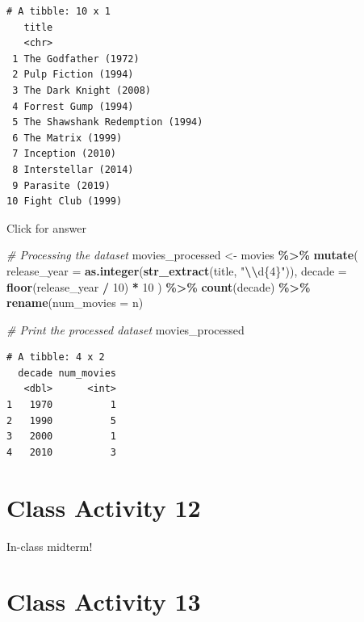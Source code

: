 \documentclass[
]{book}
\newenvironment{Shaded}{\begin{snugshade}}{\end{snugshade}}
\newcommand{\AttributeTok}[1]{\textcolor[rgb]{0.13,0.29,0.53}{#1}}
\newcommand{\CommentTok}[1]{\textcolor[rgb]{0.56,0.35,0.01}{\textit{#1}}}
\newcommand{\DecValTok}[1]{\textcolor[rgb]{0.00,0.00,0.81}{#1}}
\newcommand{\FunctionTok}[1]{\textcolor[rgb]{0.13,0.29,0.53}{\textbf{#1}}}
\newcommand{\NormalTok}[1]{#1}
\newcommand{\OtherTok}[1]{\textcolor[rgb]{0.56,0.35,0.01}{#1}}
\newcommand{\SpecialCharTok}[1]{\textcolor[rgb]{0.81,0.36,0.00}{\textbf{#1}}}
\newcommand{\StringTok}[1]{\textcolor[rgb]{0.31,0.60,0.02}{#1}}
\begin{document}
\begin{verbatim}
# A tibble: 10 x 1
   title                          
   <chr>                          
 1 The Godfather (1972)           
 2 Pulp Fiction (1994)            
 3 The Dark Knight (2008)         
 4 Forrest Gump (1994)            
 5 The Shawshank Redemption (1994)
 6 The Matrix (1999)              
 7 Inception (2010)               
 8 Interstellar (2014)            
 9 Parasite (2019)                
10 Fight Club (1999)              
\end{verbatim}

Click for answer

\begin{Shaded}
\begin{Highlighting}[]
\CommentTok{\# Processing the dataset}
\NormalTok{movies\_processed }\OtherTok{\textless{}{-}}\NormalTok{ movies }\SpecialCharTok{\%\textgreater{}\%}
  \FunctionTok{mutate}\NormalTok{(}
    \AttributeTok{release\_year =} \FunctionTok{as.integer}\NormalTok{(}\FunctionTok{str\_extract}\NormalTok{(title, }\StringTok{"}\SpecialCharTok{\textbackslash{}\textbackslash{}}\StringTok{d\{4\}"}\NormalTok{)),}
    \AttributeTok{decade =} \FunctionTok{floor}\NormalTok{(release\_year }\SpecialCharTok{/} \DecValTok{10}\NormalTok{) }\SpecialCharTok{*} \DecValTok{10}
\NormalTok{  ) }\SpecialCharTok{\%\textgreater{}\%}
  \FunctionTok{count}\NormalTok{(decade) }\SpecialCharTok{\%\textgreater{}\%}
  \FunctionTok{rename}\NormalTok{(}\AttributeTok{num\_movies =}\NormalTok{ n)}

\CommentTok{\# Print the processed dataset}
\NormalTok{movies\_processed}
\end{Highlighting}
\end{Shaded}

\begin{verbatim}
# A tibble: 4 x 2
  decade num_movies
   <dbl>      <int>
1   1970          1
2   1990          5
3   2000          1
4   2010          3
\end{verbatim}

\hypertarget{class-activity-12}{%
\chapter{Class Activity 12}\label{class-activity-12}}

In-class midterm!

\hypertarget{class-activity-13}{%
\chapter{Class Activity 13}\label{class-activity-13}}
\end{document}
